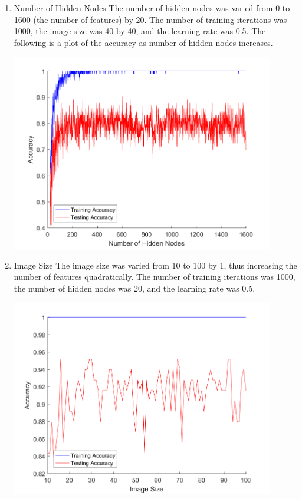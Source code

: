\documentclass[12pt]{article}
\begin{document}
\begin{enumerate}
  \item Number of Hidden Nodes
  The number of hidden nodes was varied from 0 to 1600 (the number of features) by 20. The number of training iterations was 1000, the image size was 40 by 40, and the learning rate was 0.5. The following is a plot of the accuracy as number of hidden nodes increases.
  \begin{center}
    \includegraphics[width=115mm]{./accuracy_imgs/num_hidden_nodes_empirical.png}
    \label{fig:num_hidden_nodes}
  \end{center}
  \item Image Size
  The image size was varied from 10 to 100 by 1, thus increasing the number of features quadratically. The number of training iterations was 1000, the number of hidden nodes was 20, and the learning rate was 0.5.
  \begin{center}
    \includegraphics[width=115mm]{./accuracy_imgs/image_size_empirical.png}

\end{center}
\end{enumerate}
\end{document}

